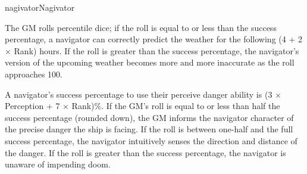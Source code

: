 \begin{Skill}[1.1]{nagivator}{Nagivator}

The GM rolls percentile dice; if the roll is equal to or less than the
success percentage, a navigator can correctly predict the weather for
the following (4 + 2 × Rank) hours. If the roll is greater than the
success percentage, the navigator’s version of the upcoming weather
becomes more and more inaccurate as the roll approaches 100.


A navigator’s success percentage to use their perceive danger ability
is (3 × Perception + 7 × Rank)\%.  If the GM’s roll is equal to or
less than half the success percentage (rounded down), the GM informs
the navigator character of the precise danger the ship is facing. If
the roll is between one-half and the full success percentage, the
navigator intuitively senses the direction and distance of the danger.
If the roll is greater than the success percentage, the navigator is
unaware of impending doom.

\end{Skill}
